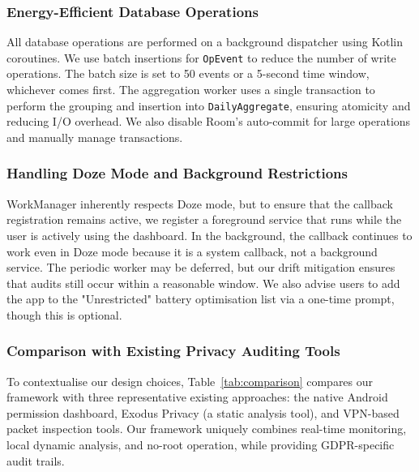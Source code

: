 \subsubsection{Energy-Efficient Database Operations}

All database operations are performed on a background dispatcher using Kotlin coroutines. We use batch insertions for \texttt{OpEvent} to reduce the number of write operations. The batch size is set to 50 events or a 5-second time window, whichever comes first. The aggregation worker uses a single transaction to perform the grouping and insertion into \texttt{DailyAggregate}, ensuring atomicity and reducing I/O overhead. We also disable Room's auto-commit for large operations and manually manage transactions.

\subsubsection{Handling Doze Mode and Background Restrictions}

WorkManager inherently respects Doze mode, but to ensure that the callback registration remains active, we register a foreground service that runs while the user is actively using the dashboard. In the background, the callback continues to work even in Doze mode because it is a system callback, not a background service. The periodic worker may be deferred, but our drift mitigation ensures that audits still occur within a reasonable window. We also advise users to add the app to the "Unrestricted" battery optimisation list via a one-time prompt, though this is optional.

\subsubsection{Comparison with Existing Privacy Auditing Tools}

To contextualise our design choices, Table~\ref{tab:comparison} compares our framework with three representative existing approaches: the native Android permission dashboard, Exodus Privacy (a static analysis tool), and VPN-based packet inspection tools. Our framework uniquely combines real-time monitoring, local dynamic analysis, and no-root operation, while providing GDPR-specific audit trails.

